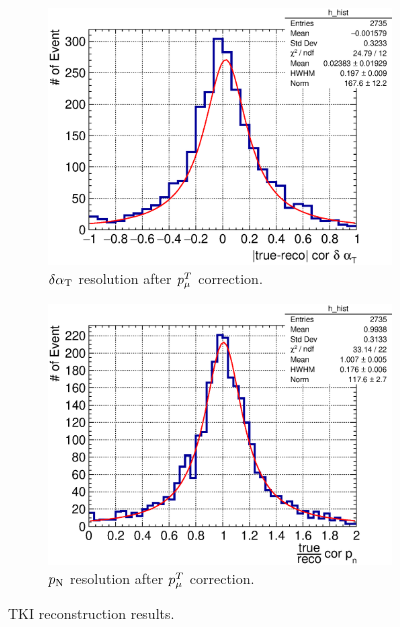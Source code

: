 \begin{figure}[!htb]
           \\
            \begin{subfigure}{0.45\textwidth}
                \includegraphics[width=\textwidth]{figures/cor_dalphat_rat_hist_al14.eps}
                \caption{$\delta\alpha_\textrm{T}$ resolution after $p_{\mu}^T$ correction.}
                \label{fig:0pi-cordat}
           \end{subfigure}
           \begin{subfigure}{0.45\textwidth}
                \includegraphics[width=\textwidth]{figures/cor_pn_rat_hist_al14.eps}
                \caption{$p_\textrm{N}$ resolution after $p_{\mu}^T$ correction.}
                \label{fig:0pi-corpn}
           \end{subfigure}
           \caption{TKI reconstruction results.}
           \label{fig:tki-res-bfafESC}
        \end{figure}


